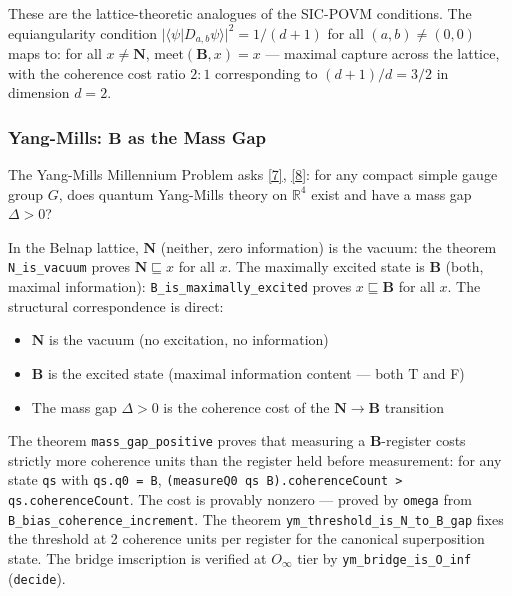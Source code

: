 \documentclass[10pt,a4paper]{article}
\begin{document}
These are the lattice-theoretic analogues of the SIC-POVM conditions. The equiangularity condition $|\langle \psi | D_{a,b} \psi \rangle|^2 = 1/(d+1)$ for all $(a,b) \neq (0,0)$ maps to: for all $x \neq \mathbf{N}$, $\text{meet}(\mathbf{B}, x) = x$ --- maximal capture across the lattice, with the coherence cost ratio $2:1$ corresponding to $(d+1)/d = 3/2$ in dimension $d=2$.

\subsubsection{Yang-Mills: $\mathbf{B}$ as the Mass Gap}

The Yang-Mills Millennium Problem asks \href{}{{[}7{]}}, \href{}{{[}8{]}}: for any compact simple gauge group $G$, does quantum Yang-Mills theory on $\mathbb{R}^4$ exist and have a mass gap $\Delta > 0$?

In the Belnap lattice, $\mathbf{N}$ (neither, zero information) is the vacuum: the theorem \texttt{N\_\allowbreak is\_\allowbreak vacuum} proves $\mathbf{N} \sqsubseteq x$ for all $x$. The maximally excited state is $\mathbf{B}$ (both, maximal information): \texttt{B\_\allowbreak is\_\allowbreak maximally\_\allowbreak excited} proves $x \sqsubseteq \mathbf{B}$ for all $x$. The structural correspondence is direct:

\begin{itemize}
    \item $\mathbf{N}$ is the vacuum (no excitation, no information)
    \item $\mathbf{B}$ is the excited state (maximal information content --- both T and F)
    \item The mass gap $\Delta > 0$ is the coherence cost of the $\mathbf{N} \to \mathbf{B}$ transition
\end{itemize}

The theorem \texttt{mass\_\allowbreak gap\_\allowbreak positive} proves that measuring a $\mathbf{B}$-register costs strictly more coherence units than the register held before measurement: for any state \texttt{qs} with \texttt{qs.\allowbreak q0 = B}, \texttt{(measureQ0 qs B).\allowbreak coherenceCount \textgreater{} qs.\allowbreak coherenceCount}. The cost is provably nonzero --- proved by \texttt{omega} from \texttt{B\_\allowbreak bias\_\allowbreak coherence\_\allowbreak increment}. The theorem \texttt{ym\_\allowbreak threshold\_\allowbreak is\_\allowbreak N\_\allowbreak to\_\allowbreak B\_\allowbreak gap} fixes the threshold at 2 coherence units per register for the canonical superposition state. The bridge imscription is verified at $O_{\infty}$ tier by \texttt{ym\_\allowbreak bridge\_\allowbreak is\_\allowbreak O\_\allowbreak inf} (\texttt{decide}).
\end{document}
